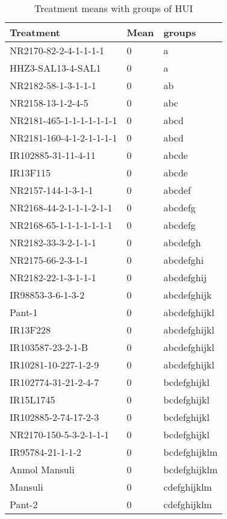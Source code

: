 \documentclass[]{article}
\begin{document}
\begin{longtable}{lll}
\caption{\label{tab:two-fac-groups-tab-agroclimate-normal}Treatment means with groups of HUI}\\
\toprule
Treatment & Mean & groups\\
\midrule
\rowcolor{gray!6}  NR2170-82-2-4-1-1-1-1 & 0 & a\\
HHZ3-SAL13-4-SAL1 & 0 & a\\
\rowcolor{gray!6}  NR2182-58-1-3-1-1-1 & 0 & ab\\
NR2158-13-1-2-4-5 & 0 & abc\\
\rowcolor{gray!6}  NR2181-465-1-1-1-1-1-1-1 & 0 & abcd\\
\addlinespace
NR2181-160-4-1-2-1-1-1-1 & 0 & abcd\\
\rowcolor{gray!6}  IR102885-31-11-4-11 & 0 & abcde\\
IR13F115 & 0 & abcde\\
\rowcolor{gray!6}  NR2157-144-1-3-1-1 & 0 & abcdef\\
NR2168-44-2-1-1-1-2-1-1 & 0 & abcdefg\\
\addlinespace
\rowcolor{gray!6}  NR2168-65-1-1-1-1-1-1-1 & 0 & abcdefg\\
NR2182-33-3-2-1-1-1 & 0 & abcdefgh\\
\rowcolor{gray!6}  NR2175-66-2-3-1-1 & 0 & abcdefghi\\
NR2182-22-1-3-1-1-1 & 0 & abcdefghij\\
\rowcolor{gray!6}  IR98853-3-6-1-3-2 & 0 & abcdefghijk\\
\addlinespace
Pant-1 & 0 & abcdefghijkl\\
\rowcolor{gray!6}  IR13F228 & 0 & abcdefghijkl\\
IR103587-23-2-1-B & 0 & abcdefghijkl\\
\rowcolor{gray!6}  IR10281-10-227-1-2-9 & 0 & abcdefghijkl\\
IR102774-31-21-2-4-7 & 0 & bcdefghijkl\\
\addlinespace
\rowcolor{gray!6}  IR15L1745 & 0 & bcdefghijkl\\
IR102885-2-74-17-2-3 & 0 & bcdefghijkl\\
\rowcolor{gray!6}  NR2170-150-5-3-2-1-1-1 & 0 & bcdefghijkl\\
IR95784-21-1-1-2 & 0 & bcdefghijklm\\
\rowcolor{gray!6}  Anmol Mansuli & 0 & bcdefghijklm\\
\addlinespace
Mansuli & 0 & cdefghijklm\\
\rowcolor{gray!6}  Pant-2 & 0 & cdefghijklm\\

\end{longtable}
\end{document}
